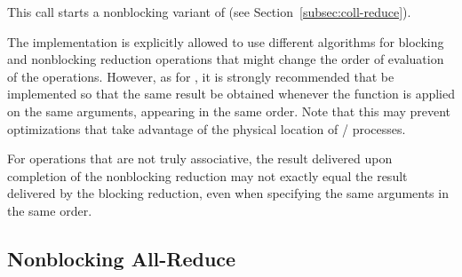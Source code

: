 This call starts a nonblocking variant of  (see
Section~\ref{subsec:coll-reduce}).


\begin{implementors}
The implementation is explicitly allowed to use different algorithms for
blocking and nonblocking reduction operations that might change the
order of evaluation of the operations. However, as for
, it is strongly recommended that
 be implemented so that the same result be
obtained whenever the function is applied on the same arguments,
appearing in the same order. Note that this may prevent optimizations
that take advantage of the physical location of \MPI/ processes.
\end{implementors}

\begin{users}
For operations that are not truly associative, the result delivered
upon completion of the nonblocking reduction may not exactly equal the
result delivered by the blocking reduction, even when specifying the
same arguments in the same order.
\end{users}



\subsection{Nonblocking All-Reduce}
\label{subsec:nbcoll-all-reduce}

